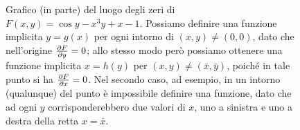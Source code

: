 \begin{figure}
	\centering
	\caption{Grafico (in parte) del luogo degli zeri di $F(x,y)=\cos y-x^3y+x-1$.
		Possiamo definire una funzione implicita $y=g(x)$ per ogni intorno di $(x,y)\ne(0,0)$, dato che nell'origine $\frac{\partial {F}}{\partial {y}}=0$; allo stesso modo però possiamo ottenere una funzione implicita $x=h(y)$ per $(x,y)\ne(\bar{x},\bar{y})$, poich\'e in tale punto si ha $\frac{\partial {F}}{\partial {x}}=0$.
		Nel secondo caso, ad esempio, in un intorno (qualunque) del punto è impossibile definire una funzione, dato che ad ogni $y$ corrisponderebbero due valori di $x$, uno a sinistra e uno a destra della retta $x=\bar{x}$.}
	\label{fig:dini-esempio}
\end{figure}

